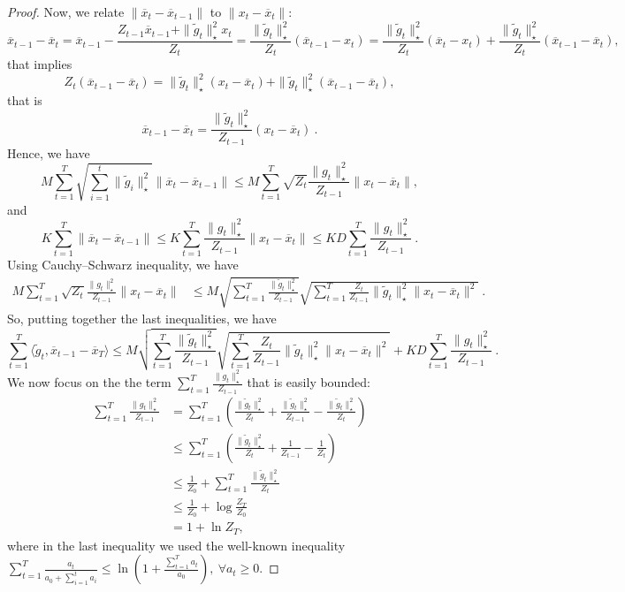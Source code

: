 \documentclass[12pt]{colt2018} %
\begin{document}
\begin{proof}
Now, we relate $\|\overline{x}_t-\overline{x}_{t-1}\|$ to $\|x_t-\overline{x}_t\|$:
\[
\overline{x}_{t-1}-\overline{x}_t 
= \overline{x}_{t-1} - \frac{Z_{t-1}\overline{x}_{t-1} + \|\tilde{g}_t\|_\star ^2 x_t}{Z_t}
=\frac{\|\tilde{g}_t\|_\star ^2}{Z_t}(\overline{x}_{t-1} - x_t)
=\frac{\|\tilde{g}_t\|_\star ^2}{Z_t}(\overline{x}_{t} - x_t) + \frac{\|\tilde{g}_t\|_\star ^2}{Z_t}(\overline{x}_{t-1}-\overline{x}_t),
\]
that implies
\[
Z_t (\overline{x}_{t-1}-\overline{x}_t)
= \|\tilde{g}_t\|_\star ^2(x_t-\overline{x}_t)+\|\tilde{g}_t\|_\star ^2(\overline{x}_{t-1}-\overline{x}_t),
\]
that is
\begin{equation}
\label{eq:lemma_shortcut_eq1}
\overline{x}_{t-1}-\overline{x}_t
= \frac{\|\tilde{g}_t\|_\star ^2}{Z_{t-1}}(x_t-\overline{x}_t)~.
\end{equation}
Hence, we have 
\[
M\sum_{t=1}^{T}\sqrt{\sum_{i=1}^t \|\tilde{g}_i\|^2_\star }\|\overline{x}_{t}-\overline{x}_{t-1}\|
\leq M\sum_{t=1}^T \sqrt{Z_t}\frac{\|g_t\|_\star ^2}{Z_{t-1}}\|x_t-\overline{x}_t\|,
\]
and
\[
K\sum_{t=1}^{T}\|\overline{x}_{t}-\overline{x}_{t-1}\|
\leq K\sum_{t=1}^T \frac{\|g_t\|_\star ^2}{Z_{t-1}}\|x_t-\overline{x}_t\|
\leq K D\sum_{t=1}^T \frac{\|g_t\|_\star ^2}{Z_{t-1}}~.
\]
Using Cauchy–Schwarz inequality, we have
\begin{align*}
M\sum_{t=1}^T \sqrt{Z_t}\frac{\|g_t\|_\star ^2}{Z_{t-1}}\|x_t-\overline{x}_t\|
&\leq M\sqrt{\sum_{t=1}^T \frac{\|\tilde{g}_t\|_\star ^2}{Z_{t-1}}} \sqrt{\sum_{t=1}^T \frac{Z_t}{Z_{t-1}}\|\tilde{g}_t\|_\star ^2\|x_t-\overline{x}_t\|^2 }~.
\end{align*}
So, putting together the last inequalities, we have
\[
\sum_{t=1}^T \langle \tilde{g}_t, \overline{x}_{t-1}-\overline{x}_T\rangle \leq M\sqrt{\sum_{t=1}^T \frac{\|\tilde{g}_t\|_\star ^2}{Z_{t-1}}} \sqrt{\sum_{t=1}^T \frac{Z_t}{Z_{t-1}}\|\tilde{g}_t\|_\star ^2\|x_t-\overline{x}_t\|^2 } + K D\sum_{t=1}^T \frac{\|g_t\|_\star ^2}{Z_{t-1}}~.
\]
We now focus on the the term $\sum_{t=1}^T \frac{\|g_t\|_\star ^2}{Z_{t-1}}$ that is easily bounded:
\begin{align*}
\sum_{t=1}^T \frac{\|g_t\|_\star ^2}{Z_{t-1}}
&= \sum_{t=1}^T \left(\frac{\|\tilde{g}_t\|_\star ^2}{Z_{t}} + \frac{\|\tilde{g}_t\|_\star ^2}{Z_{t-1}}-\frac{\|\tilde{g}_t\|_\star ^2}{Z_{t}}\right)\\
&\leq \sum_{t=1}^T \left(\frac{\|\tilde{g}_t\|_\star ^2}{Z_{t}} + \frac{1}{Z_{t-1}}-\frac{1}{Z_{t}}\right) \\
&\leq \frac{1}{Z_{0}}+\sum_{t=1}^T \frac{\|\tilde{g}_t\|_\star ^2}{Z_{t}}  \\
&\leq \frac{1}{Z_{0}}+\log\frac{Z_T}{Z_0} \\
&= 1+\ln Z_T,
\end{align*}
where in the last inequality we used the well-known inequality $\sum_{t=1}^T \frac{a_t}{a_0+\sum_{i=1}^t a_i} \leq \ln(1+\frac{\sum_{t=1}^T a_t}{a_0}),  \ \forall a_t\geq0$.


\end{proof}
\end{document}
